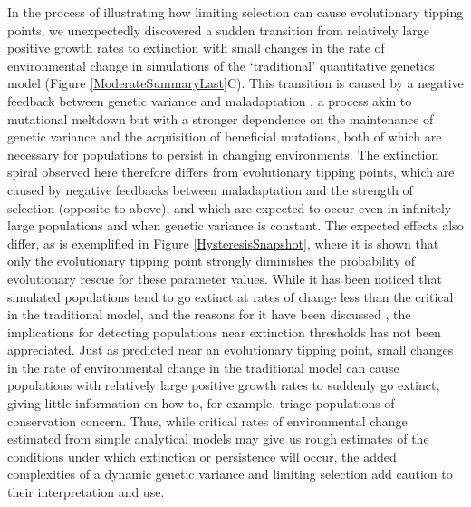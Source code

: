\documentclass[12pt,letterpaper]{article} %
\begin{document}
In the process of illustrating how limiting selection can cause evolutionary tipping points, we unexpectedly discovered a sudden transition from relatively large positive growth rates to extinction with small changes in the rate of environmental change in simulations of the `traditional' quantitative genetics model (Figure \ref{ModerateSummaryLast}C).
This transition is caused by a negative feedback between genetic variance and maladaptation \citep{Burger1995}, a process akin to mutational meltdown \citep[][]{Lynch1990} but with a stronger dependence on the maintenance of genetic variance and the acquisition of beneficial mutations, both of which are necessary for populations to persist in changing environments. 
The extinction spiral observed here therefore differs from evolutionary tipping points, which are caused by negative feedbacks between maladaptation and the strength of selection (opposite to above), and which are expected to occur even in infinitely large populations and when genetic variance is constant.
The expected effects also differ, as is exemplified in Figure \ref{HysteresisSnapshot}, where it is shown that only the evolutionary tipping point strongly diminishes the probability of evolutionary rescue for these parameter values.
While it has been noticed that simulated populations tend to go extinct at rates of change less than the critical in the traditional model, and the reasons for it have been discussed \citep{Burger1995}, the implications for detecting populations near extinction thresholds has not been appreciated.
Just as predicted near an evolutionary tipping point, small changes in the rate of environmental change in the traditional model can cause populations with relatively large positive growth rates to suddenly go extinct, giving little information on how to, for example, triage populations of conservation concern.
Thus, while critical rates of environmental change estimated from simple analytical models may give us rough estimates of the conditions under which extinction or persistence will occur, the added complexities of a dynamic genetic variance and limiting selection add caution to their interpretation and use.
    
\end{document}

